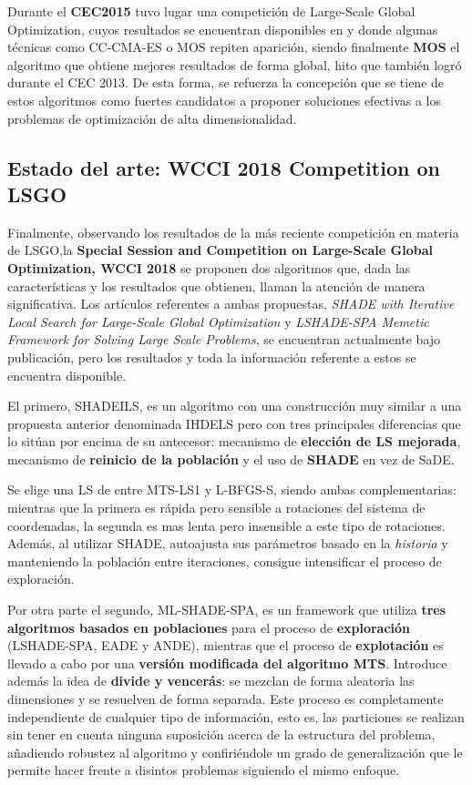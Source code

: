 Durante el \textbf{CEC2015} tuvo lugar una competición de Large-Scale Global Optimization, cuyos resultados se encuentran disponibles en \cite{CEC15-Res-LSGO} y donde algunas técnicas como CC-CMA-ES o MOS  repiten aparición, siendo finalmente \textbf{MOS} el algoritmo que obtiene mejores resultados de forma global, hito que también logró durante el CEC 2013. De esta forma, se refuerza la concepción que se tiene de estos algoritmos como fuertes candidatos a proponer soluciones efectivas a los problemas de optimización de alta dimensionalidad.

\subsection{Estado del arte: WCCI 2018 Competition on LSGO}

Finalmente, observando los resultados de la más reciente competición en materia de LSGO,la \textbf{Special Session and Competition on Large-Scale Global Optimization, WCCI 2018} se proponen dos algoritmos que, dada las características y los resultados que obtienen, llaman la atención de manera significativa. Los artículos referentes a ambas propuestas, \textit{SHADE with Iterative Local Search for Large-Scale Global Optimization}\cite{SHADEILS} y \textit{LSHADE-SPA Memetic Framework for Solving Large Scale Problems}\cite{ML-SHADE-SPA}, se encuentran actualmente bajo publicación, pero los resultados y toda la información referente a estos se encuentra disponible.

El primero, SHADEILS, es un algoritmo con una construcción muy similar a una propuesta anterior denominada IHDELS\cite{IHDELS} pero con tres principales diferencias que lo sitúan por encima de su antecesor: mecanismo de \textbf{elección de LS mejorada}, mecanismo de \textbf{reinicio de la población} y el uso de \textbf{SHADE}\cite{SHADE} en vez de SaDE. 

Se elige una LS de entre  MTS-LS1\cite{MTS-LSGO} y L-BFGS-S\cite{LBFGSB}, siendo ambas complementarias: mientras que la primera es rápida pero sensible a rotaciones del sistema de coordenadas, la segunda es mas lenta pero insensible a este tipo de rotaciones. Además, al utilizar SHADE, autoajusta sus parámetros basado en la \textit{historia} y manteniendo la población entre iteraciones, consigue intensificar el proceso de exploración. 

Por otra parte el segundo, ML-SHADE-SPA, es un framework que utiliza \textbf{tres algoritmos basados en poblaciones} para el proceso de \textbf{exploración} (LSHADE-SPA, EADE y ANDE), mientras que el proceso de \textbf{explotación} es llevado a cabo por una \textbf{versión modificada del algoritmo MTS}. Introduce además la idea de \textbf{divide y vencerás}: se mezclan de forma aleatoria las dimensiones y se resuelven de forma separada. Este proceso es completamente independiente de cualquier tipo de información, esto es, las particiones se realizan sin tener en cuenta ninguna suposición acerca de la estructura del problema, añadiendo robustez al algoritmo y confiriéndole un grado de generalización que le permite hacer frente a disintos problemas siguiendo el mismo enfoque.

